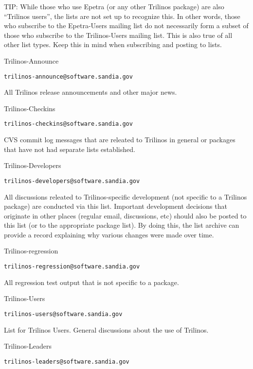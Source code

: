 \documentclass[12pt,relax]{TrilinosDevGuide}
\begin{document}
TIP: While those who use Epetra (or any other Trilinos package) are also
``Trilinos users'', the lists are not set up to recognize this.  In other 
words, those who subscribe to the Epetra-Users mailing list do not necessarily 
form a subset of those who subscribe to the Trilinos-Users mailing list.  This 
is also true of all other list types.  Keep this in mind when subscribing and 
posting to lists.

\triangleright Trilinos-Announce 
\begin{verbatim}trilinos-announce@software.sandia.gov\end{verbatim}

All Trilinos release announcements and other major news.

\triangleright Trilinos-Checkins 
\begin{verbatim}trilinos-checkins@software.sandia.gov\end{verbatim}

CVS commit log messages that are releated to Trilinos in general or packages 
that have not had separate lists established.

\triangleright Trilinos-Developers 
\begin{verbatim}trilinos-developers@software.sandia.gov\end{verbatim}

All discussions releated to Trilinos-specific development (not specific to a 
Trilinos package) are conducted via this list.  Important development 
decisions that originate in other places (regular email, discussions, etc) 
should also be posted to this list (or to the appropriate package list).  
By doing this, the list archive can provide a record explaining why various 
changes were made over time.

\triangleright Trilinos-regression 
\begin{verbatim}trilinos-regression@software.sandia.gov\end{verbatim}

All regression test output that is not specific to a package. 

\triangleright Trilinos-Users 
\begin{verbatim}trilinos-users@software.sandia.gov\end{verbatim}

List for Trilinos Users.  General discussions about the use of Trilinos.

\bullet Trilinos-Leaders
\begin{verbatim}trilinos-leaders@software.sandia.gov\end{verbatim}
\end{document}
